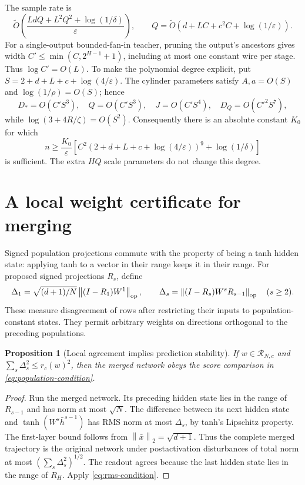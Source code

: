 \documentclass[11pt]{article}
\newtheorem{proposition}[theorem]{Proposition}
\newcommand{\norm}[1]{\left\|#1\right\|}
\begin{document}
The sample rate is
\[
 \widetilde O\left(\frac{LdQ+L^2Q^2+\log(1/\delta)}\varepsilon\right),
 \qquad Q=\widetilde O(d+LC+c^2C+\log(1/\varepsilon)).
\]
For a single-output bounded-fan-in teacher, pruning the output's ancestors
gives width $C'\le\min(C,2^{H-1}+1)$, including at most one constant wire
per stage. Thus $\log C'=O(L)$. To make the polynomial degree explicit, put
$S=2+d+L+c+\log(4/\varepsilon)$. The cylinder parameters satisfy
$A,a=O(S)$ and $\log(1/\rho)=O(S)$; hence
\[
 D_*=O(C'S^3),\quad Q=O(C'S^3),\quad J=O(C'S^4),\quad
 D_Q=O(C'^2S^7),
\]
while $\log(3+4R/\zeta)=O(S^2)$. Consequently there is an absolute
constant $K_0$ for which
\[
 n\ge\frac{K_0}\varepsilon
 [C^2(2+d+L+c+\log(4/\varepsilon))^9+\log(1/\delta)]
\]
is sufficient. The extra $HQ$ scale parameters do not change this degree.

\section{A local weight certificate for merging}

Signed population projections commute with the property of being a tanh
hidden state: applying tanh to a vector in their range keeps it in their
range. For proposed signed projections $R_s$, define
\[
 \Delta_1=\sqrt{(d+1)/N}\norm{(I-R_1)W^1}_{\rm op},\qquad
 \Delta_s=\norm{(I-R_s)W^sR_{s-1}}_{\rm op}\quad(s\ge2).
\]
These measure disagreement of rows after restricting their inputs to
population-constant states. They permit arbitrary weights on directions
orthogonal to the preceding populations.

\begin{proposition}[Local agreement implies prediction stability]
If $w\in\mathcal R_{N,c}$ and $\sum_s\Delta_s^2\le r_c(w)^2$, then the
merged network obeys the score comparison in
\eqref{eq:population-condition}.
\end{proposition}
\begin{proof}
Run the merged network. Its preceding hidden state lies in the range of
$R_{s-1}$ and has norm at most $\sqrt N$. The difference between its next
hidden state and $\tanh(W^s\bar h^{s-1})$ has RMS norm at most $\Delta_s$,
by tanh's Lipschitz property. The first-layer bound follows from
$\norm{\bar x}_2=\sqrt{d+1}$. Thus the complete merged trajectory is the
original network under postactivation disturbances of total norm at most
$(\sum_s\Delta_s^2)^{1/2}$. The readout agrees because the last hidden
state lies in the range of $R_H$. Apply \eqref{eq:rms-condition}.
\end{proof}
\end{document}
